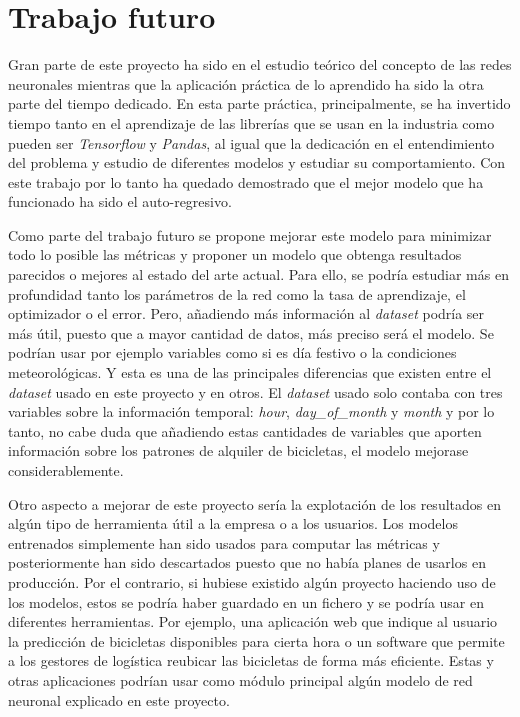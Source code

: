 \section{Trabajo futuro}\label{future_work}

Gran parte de este proyecto ha sido en el estudio teórico del concepto de las redes neuronales mientras que la aplicación práctica de lo aprendido ha sido la otra parte del tiempo dedicado. En esta parte práctica, principalmente, se ha invertido tiempo tanto en el aprendizaje de las librerías que se usan en la industria como pueden ser \textit{Tensorflow} y \textit{Pandas}, al igual que la dedicación en el entendimiento del problema y estudio de diferentes modelos y estudiar su comportamiento. Con este trabajo por lo tanto ha quedado demostrado que el mejor modelo que ha funcionado ha sido el auto-regresivo.
\newline

Como parte del trabajo futuro se propone mejorar este modelo para minimizar todo lo posible las métricas y proponer un modelo que obtenga resultados parecidos o mejores al estado del arte actual. Para ello, se podría estudiar más en profundidad tanto los parámetros de la red como la tasa de aprendizaje, el optimizador o el error. Pero, añadiendo más información al \textit{dataset} podría ser más útil, puesto que a mayor cantidad de datos, más preciso será el modelo. Se podrían usar por ejemplo variables como si es día festivo o la condiciones meteorológicas. Y esta es una de las principales diferencias que existen entre el \textit{dataset} usado en este proyecto y en otros. El \textit{dataset} usado solo contaba con tres variables sobre la información temporal: \textit{hour}, \textit{day\_of\_month} y \textit{month} y por lo tanto, no cabe duda que añadiendo estas cantidades de variables que aporten información sobre los patrones de alquiler de bicicletas, el modelo mejorase considerablemente.
\newline

Otro aspecto a mejorar de este proyecto sería la explotación de los resultados en algún tipo de herramienta útil a la empresa o a los usuarios. Los modelos entrenados simplemente han sido usados para computar las métricas y posteriormente han sido descartados puesto que no había planes de usarlos en producción. Por el contrario, si hubiese existido algún proyecto haciendo uso de los modelos, estos se podría haber guardado en un fichero y se podría usar en diferentes herramientas. Por ejemplo, una aplicación web que indique al usuario la predicción de bicicletas disponibles para cierta hora o un software que permite a los gestores de logística reubicar las bicicletas de forma más eficiente. Estas y otras aplicaciones podrían usar como módulo principal algún modelo de red neuronal explicado en este proyecto.
\newline



